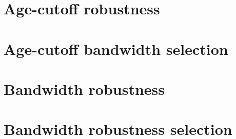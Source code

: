\section{Age-cutoff robustness}
\begingroup
\singlespacing








\clearpage
\endgroup
\section{Age-cutoff bandwidth selection}
\begingroup
\singlespacing


\clearpage
\endgroup
\section{Bandwidth robustness}
\begingroup
\singlespacing




\clearpage
\endgroup
\section{Bandwidth robustness selection}
\begingroup
\singlespacing


\clearpage
\endgroup
